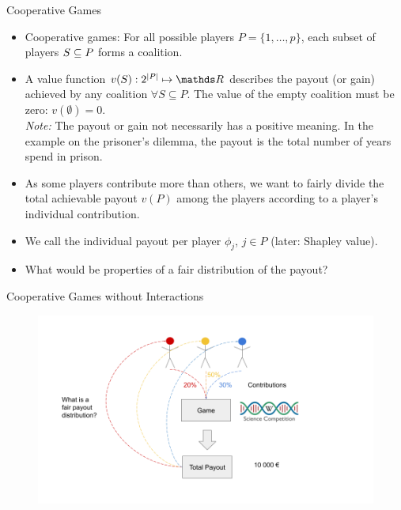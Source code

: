 \documentclass[11pt,compress,t,notes=noshow, aspectratio=169, xcolor=table]{beamer}
\begin{document}
\begin{vbframe}{Cooperative Games}
\begin{itemize}
\itemsep1em
  \item Cooperative games: For all possible players $P = \{1, \hdots, p\}$, each subset of players  $\SsubP$ forms a coalition.
  \item A value function $v(S): 2^{|P|}\mapsto \R$ describes the payout (or gain) achieved by any coalition $\forall S \subseteq P$. The value of the empty coalition must be zero: $v(\emptyset) = 0$.\\
  \textit{Note:} The payout or gain not necessarily has a positive meaning. In the example on the prisoner's dilemma, the payout is the total number of years spend in prison.
  \item As some players contribute more than others, we want to fairly divide the total achievable payout $v(P)$ among the players according to a player's individual contribution.
  \item We call the individual payout per player $\phi_j$, $j \in P$ (later: Shapley value).
  \item What would be properties of a fair distribution of the payout?
\end{itemize}
\end{vbframe}

\begin{vbframe}{Cooperative Games without Interactions}


\begin{figure}
    \centering
    \includegraphics{figure/Shapley_1.png}
\end{figure}

\end{vbframe}
\end{document}
